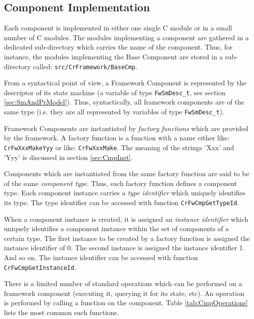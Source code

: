 \documentclass{pnp_article}
\begin{document}
\subsection{Component Implementation}\label{sec:CmpImpl} 

Each component is implemented in either one single C module or in a small number of C modules. The modules implementing a component are gathered in a dedicated sub-directory which carries the name of the component. Thus, for instance, the modules implementing the Base Component are stored in a sub-directory called: \texttt{src/CrFramework/BaseCmp}.

From a syntactical point of view, a Framework Component is represented by the descriptor of its state machine (a variable of type \texttt{FwSmDesc\_t}, see section \ref{sec:SmAndPrModel}). Thus, syntactically, all framework components are of the same type (i.e. they are all represented by variables of type \texttt{FwSmDesc\_t}). 

Framework Components are instantiated by \textit{factory functions} which are provided by the framework. A factory function is a function with a name either like: \texttt{CrFwXxxMakeYyy} or like: \texttt{CrFwXxxMake}. The meaning of the strings 'Xxx' and 'Yyy' is discussed in section  \ref{sec:CmpInst}.

Components which are instantiated from the same factory function are said to be of the same \textit{component type}. Thus, each factory function defines a component type. Each component instance carries a \textit{type identifier} which uniquely identifies its type. The type identifier can be accessed with function \texttt{CrFwCmpGetTypeId}.

When a component instance is created, it is assigned an \textit{instance identifier} which uniquely identifies a component instance within the set of components of a certain type. The first instance to be created by a factory function is assigned the instance identifier of 0. The second instance is assigned the instance identifier 1. And so on. The instance identifier can be accessed with function \texttt{CrFwCmpGetInstanceId}.

There is a limited number of standard operations which can be performed on a framework component (executing it, querying it for its state, etc). An operation is performed by calling a function on the component. Table \ref{tab:CmpOperations} lists the most common such functions. 
\end{document}
